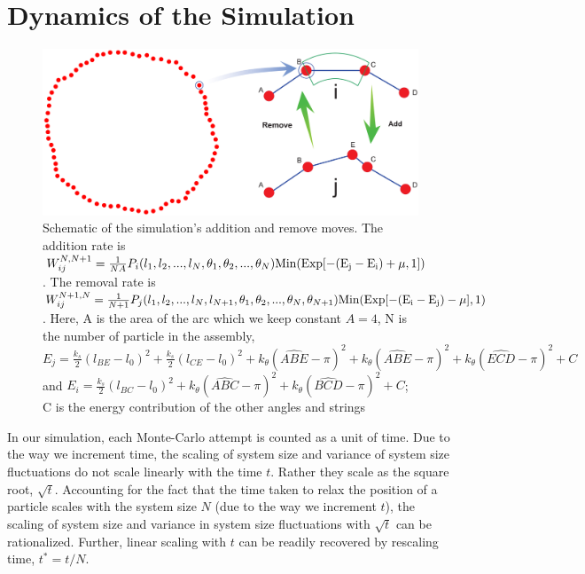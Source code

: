 \documentclass[amsmath,preprintnumbers,10pt,nofootinbib,prl,twocolumn]{revtex4-1}
\begin{document}
\section{Dynamics of the Simulation}
\begin{figure}[h!]
\includegraphics[width=1\linewidth,angle=0]{AddingMoveSchematicFig1.pdf}
\caption{ Schematic of the simulation's addition and remove moves. The addition rate is $W_{ij}^{N,N+1}=\frac{1}{NA} P_i(l_1,l_2,...,l_N,\theta_1,\theta_2,...,\theta_N)\rm{Min}(\rm{Exp}[-(E_j-E_i) +\mu,1])$. The removal rate is $W_{ij}^{N+1,N}=\frac{1}{N+1}P_j(l_1,l_2,...,l_N,l_{N+1},\theta_1,\theta_2,...,\theta_N,\theta_{N+1})\rm{Min}(\rm{Exp}[-(E_i-E_j) -\mu],1)$. Here, A is the area of the arc which we keep constant $A=4$, N is the number of particle in the assembly, $E_j = \frac{k_s}{2}(l_{BE}-l_0)^2+\frac{k_s}{2}(l_{CE}-l_0)^2+k_\theta(\widehat{ABE}-\pi)^2+k_\theta(\widehat{ABE}-\pi)^2+k_\theta(\widehat{ECD}-\pi)^2+C$ and $E_i=\frac{k_s}{2}(l_{BC}-l_0)^2+k_\theta(\widehat{ABC}-\pi)^2+k_\theta(\widehat{BCD}-\pi)^2+C$; C is the energy contribution of the other angles and strings }
\label{fig:SimulationSchematic}
\end{figure}
In our simulation, each Monte-Carlo attempt is counted as a unit of time. Due to the way we increment time, the scaling of system size and variance of system size fluctuations do not scale linearly with the time $t$. Rather they scale as the square root, $\sqrt{t}$. Accounting for the fact that the time taken to relax the position of a particle scales with the system size $N$ (due to the way we increment $t$), the scaling of system size and variance in system size fluctuations with $\sqrt{t}$ can be rationalized. Further, linear scaling with $t$ can be readily recovered by rescaling time, $t^*=t/N$.
\end{document}
